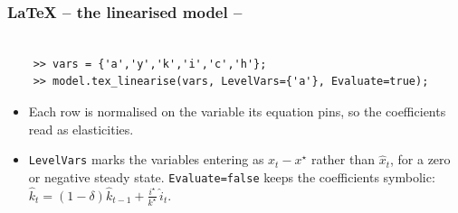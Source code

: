 \documentclass[10pt,slidestop]{beamer}
\theoremstyle{plain}
\begin{document}
\begin{frame}[c,fragile]
  \frametitle{LaTeX -- the linearised model --}

  \begin{lstlisting}[style=MatlabConsole]

    >> vars = {'a','y','k','i','c','h'};
    >> model.tex_linearise(vars, LevelVars={'a'}, Evaluate=true);
  \end{lstlisting}

  \medskip


  \medskip

  \begin{itemize}

  \item Each row is normalised on the variable its equation pins, so the
    coefficients read as elasticities.\newline

  \item \verb+LevelVars+ marks the variables entering as $x_t-x^{\star}$ rather
    than $\hat{x}_t$, for a zero or negative steady state. \verb+Evaluate=false+
    keeps the coefficients symbolic: $\hat{k}_t =
    \left(1-\delta\right)\hat{k}_{t-1} +
    \frac{i^{\star}}{k^{\star}}\,\hat{i}_t$.

  \end{itemize}

\end{frame}
\end{document}
